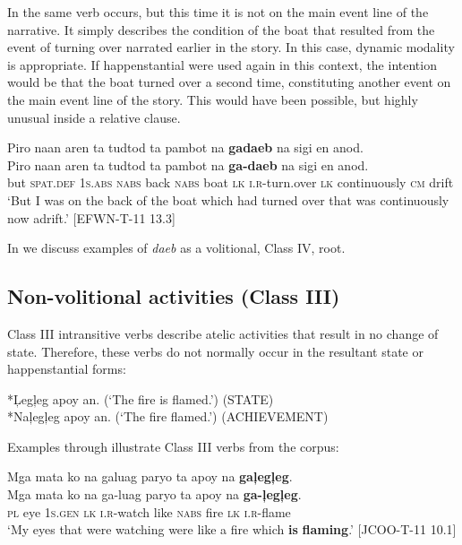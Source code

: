 In  the same verb occurs, but this time it is not on the main event line of the narrative. It simply describes the condition of the boat that resulted from the event of turning over narrated earlier in the story. In this case, dynamic modality is appropriate. If happenstantial were used again in this context, the intention would be that the boat turned over a second time, constituting another event on the main event line of the story. This would have been possible, but highly unusual inside a relative clause. 

\ea
\label{bkm:Ref148965908}
Piro  naan  aren  ta  tudtod  ta  pambot  na  \textbf{gadaeb} na  sigi  en  anod. \\\smallskip
\gll Piro  naan  aren  ta  tudtod  ta  pambot  na  \textbf{ga-daeb} na  sigi  en  anod. \\
but  \textsc{spat.def}  1\textsc{s.abs}  \textsc{nabs}  back  \textsc{nabs}  boat  \textsc{lk}  \textsc{i.r}-turn.over
\textsc{lk} continuously  \textsc{cm}  drift \\
\glt ‘But I was on the back of the boat which had turned over that was continuously now adrift.’ [EFWN-T-11 13.3]
\z

In  we discuss examples of \textit{daeb} as a volitional, Class IV, root.  

\subsection{Non-volitional activities (Class III)}
\label{sec:non-volitionalactivities-classIII}
Class III intransitive verbs describe atelic activities that result in no change of state. Therefore, these verbs do not normally occur in the resultant state or happenstantial forms:

\ea
*\c{L}egļeg apoy an.  (‘The fire is flamed.’)  (STATE) \\
*Naļegļeg apoy an.  (‘The fire flamed.’)  (ACHIEVEMENT)
\z

Examples  through  illustrate Class III verbs from the corpus:  

\ea
\label{bkm:Ref442966831}
Mga  mata  ko  na  galuag  paryo  ta  apoy  na  \textbf{gaļegļeg}. \\\smallskip
\gll Mga  mata  ko  na  ga-luag  paryo  ta  apoy  na  \textbf{ga-ļegļeg}. \\
\textsc{pl} eye  1\textsc{s.gen}  \textsc{lk}  \textsc{i.r}-watch  like  \textsc{nabs}  fire  \textsc{lk}  \textsc{i.r}-flame \\
\glt ‘My eyes that were watching were like a fire which \textbf{is} \textbf{flaming}.’ [JCOO-T-11 10.1]
\z

